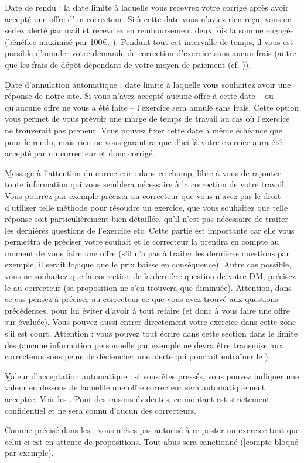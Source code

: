 \item \b{Date de rendu} : la date limite à laquelle vous recevrez votre corrigé après avoir accepté une offre d’un correcteur. Si à cette date vous n’aviez rien reçu, vous en seriez alerté par mail et recevriez en remboursement deux fois la somme engagée (bénéfice maximisé par 100€. ). Pendant tout cet intervalle de temps, il vous est possible d’annuler votre demande de correction d’exercice sans aucun frais (autre que les frais de dépôt dépendant de votre moyen de paiement (cf. )).
\item \b{Date d’annulation automatique} : date limite à laquelle vous souhaitez avoir une réponse de notre site. Si vous n’avez accepté aucune offre à cette date -- ou qu’aucune offre ne vous a été faite -- l’exercice sera annulé sans frais. Cette option vous permet de vous prévoir une marge de temps de travail au cas où l’exercice ne trouverait pas preneur. Vous pouvez fixer cette date à même échéance que pour le rendu, mais rien ne vous garantira que d’ici là votre exercice aura été accepté par un correcteur et donc corrigé.
\item \b{Message à l’attention du correcteur} : dans ce champ, libre à vous de rajouter toute information qui vous semblera nécessaire à la correction de votre travail. Vous pourrez par exemple préciser au correcteur que vous n’avez pas le droit d’utiliser telle méthode pour résoudre un exercice, que vous souhaitez que telle réponse soit particulièrement bien détaillée, qu’il n’est pas nécessaire de traiter les dernières questions de l’exercice etc. Cette partie est importante car elle vous permettra de préciser votre souhait et le correcteur la prendra en compte au moment de vous faire une offre (s’il n’a pas à traiter les dernières questions par exemple, il serait logique que le prix baisse en conséquence). Autre cas possible, vous ne souhaitez que la correction de la dernière question de votre DM, précisez-le au correcteur (sa proposition ne s’en trouvera que diminuée). Attention, dans ce cas pensez à préciser au correcteur ce que vous avez trouvé aux questions précédentes, pour lui éviter d’avoir à tout refaire (et donc à vous faire une offre sur-évaluée).
Vous pouvez aussi entrer directement votre exercice dans cette zone s’il est court. Attention : vous pouvez tout écrire dans cette section dans le limite des  (aucune information personnelle par exemple ne devra être transmise aux correcteurs sous peine de déclencher une alerte qui pourrait entraîner le ).
\item \b{Valeur d’acceptation automatique} : si vous êtes pressés, vous pouvez indiquer une valeur en dessous de laquellle une offre correcteur sera automatiquement acceptée. Voir les . Pour des raisons évidentes, ce montant est strictement confidentiel et ne sera connu d’aucun des correcteurs.

Comme précisé dans les , vous n’êtes pas autorisé à re-poster un exercice tant que celui-ci est en attente de propositions. Tout abus sera sanctionné (]{compte bloqué} par exemple).